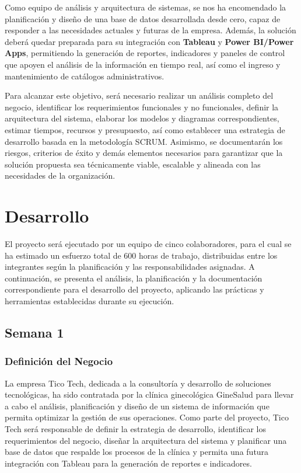 \documentclass[12pt,letterpaper]{article}
\begin{document}
Como equipo de análisis y arquitectura de sistemas, se nos ha encomendado la
planificación y diseño de una base de datos desarrollada desde cero, capaz de responder a
las necesidades actuales y futuras de la empresa. Además, la solución deberá quedar
preparada para su integración con \textbf{Tableau} y \textbf{Power BI/Power Apps},
permitiendo la generación de reportes, indicadores y paneles de control que apoyen el
análisis de la información en tiempo real, así como el ingreso y mantenimiento de
catálogos administrativos.

Para alcanzar este objetivo, será necesario realizar un análisis completo del negocio,
identificar los requerimientos funcionales y no funcionales, definir la arquitectura del
sistema, elaborar los modelos y diagramas correspondientes, estimar tiempos, recursos y
presupuesto, así como establecer una estrategia de desarrollo basada en la metodología
SCRUM. Asimismo, se documentarán los riesgos, criterios de éxito y demás elementos
necesarios para garantizar que la solución propuesta sea técnicamente viable, escalable y
alineada con las necesidades de la organización.

\section{Desarrollo}

El proyecto será ejecutado por un equipo de cinco colaboradores, para el cual se ha
estimado un esfuerzo total de 600 horas de trabajo, distribuidas entre los integrantes según
la planificación y las responsabilidades asignadas. A continuación, se presenta el análisis, la
planificación y la documentación correspondiente para el desarrollo del proyecto, aplicando
las prácticas y herramientas establecidas durante su ejecución.

\subsection{Semana 1}

\subsubsection*{Definición del Negocio}

La empresa Tico Tech, dedicada a la consultoría y desarrollo de soluciones tecnológicas, ha
sido contratada por la clínica ginecológica GineSalud para llevar a cabo el análisis,
planificación y diseño de un sistema de información que permita optimizar la gestión de sus
operaciones. Como parte del proyecto, Tico Tech será responsable de definir la estrategia
de desarrollo, identificar los requerimientos del negocio, diseñar la arquitectura del sistema y
planificar una base de datos que respalde los procesos de la clínica y permita una futura
integración con Tableau para la generación de reportes e indicadores.
\end{document}
